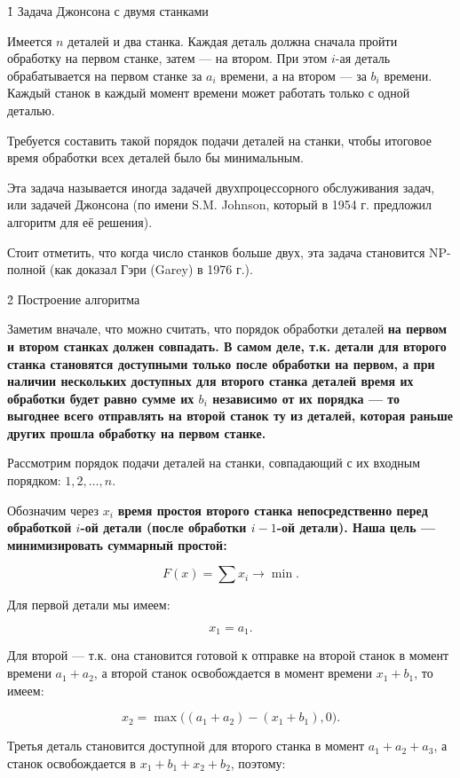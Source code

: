 \h1{ Задача Джонсона с двумя станками }

Имеется $n$ деталей и два станка. Каждая деталь должна сначала пройти обработку на первом станке, затем --- на втором. При этом $i$-ая деталь обрабатывается на первом станке за $a_i$ времени, а на втором --- за $b_i$ времени. Каждый станок в каждый момент времени может работать только с одной деталью.

Требуется составить такой порядок подачи деталей на станки, чтобы итоговое время обработки всех деталей было бы минимальным.

Эта задача называется иногда задачей двухпроцессорного обслуживания задач, или задачей Джонсона (по имени S.M. Johnson, который в 1954 г. предложил алгоритм для её решения).

Стоит отметить, что когда число станков больше двух, эта задача становится NP-полной (как доказал Гэри (Garey) в 1976 г.).


\h2{ Построение алгоритма }

Заметим вначале, что можно считать, что порядок обработки деталей \bf{на первом и втором станках должен совпадать}. В самом деле, т.к. детали для второго станка становятся доступными только после обработки на первом, а при наличии нескольких доступных для второго станка деталей время их обработки будет равно сумме их $b_i$ независимо от их порядка --- то выгоднее всего отправлять на второй станок ту из деталей, которая раньше других прошла обработку на первом станке.

Рассмотрим порядок подачи деталей на станки, совпадающий с их входным порядком: $1, 2, \ldots, n$.

Обозначим через $x_i$ \bf{время простоя} второго станка непосредственно перед обработкой $i$-ой детали (после обработки $i-1$-ой детали). Наша цель --- \bf{минимизировать суммарный простой}:

$$ F(x) = \sum x_i \longrightarrow \min. $$

Для первой детали мы имеем:

$$ x_1 = a_1. $$

Для второй --- т.к. она становится готовой к отправке на второй станок в момент времени $a_1+a_2$, а второй станок освобождается в момент времени $x_1 + b_1$, то имеем:

$$ x_2 = \max \Big( (a_1+a_2) - (x_1+b_1), 0 \Big). $$

Третья деталь становится доступной для второго станка в момент $a_1+a_2+a_3$, а станок освобождается в $x_1+b_1+x_2+b_2$, поэтому:

